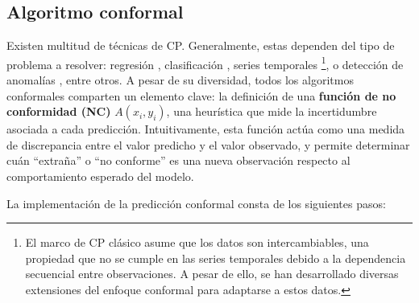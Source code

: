



\subsection{Algoritmo conformal}

Existen multitud de técnicas de \acrshort{CP}. Generalmente, estas dependen del tipo de problema a resolver: regresión \cite{papadopoulos2002, romano2019, bethell2024}, clasificación \cite{sadinle2019, romano2020, angelopoulos2020}, series temporales \cite{xu2021, zaffran2022, stankeviciute2021}%
\footnote{
    El marco de \acrshort{CP} clásico asume que los datos son intercambiables, una propiedad que no se cumple en las series temporales debido a la dependencia secuencial entre observaciones. A pesar de ello, se han desarrollado diversas extensiones del enfoque conformal para adaptarse a estos datos.
},
o detección de anomalías \cite{laxhammar2015}, entre otros. 
A pesar de su diversidad, todos los algoritmos conformales comparten un elemento clave: la definición de una 
\textbf{función de no conformidad (\acrshort{NC})} $A(x_i,y_i)$, una heurística que mide la incertidumbre asociada a cada predicción. Intuitivamente, esta función actúa como una medida de discrepancia entre el valor predicho y el valor observado, y permite determinar cuán ``extraña'' o ``no conforme'' es una nueva observación respecto al comportamiento esperado del modelo.

La implementación de la predicción conformal consta de los siguientes pasos:

